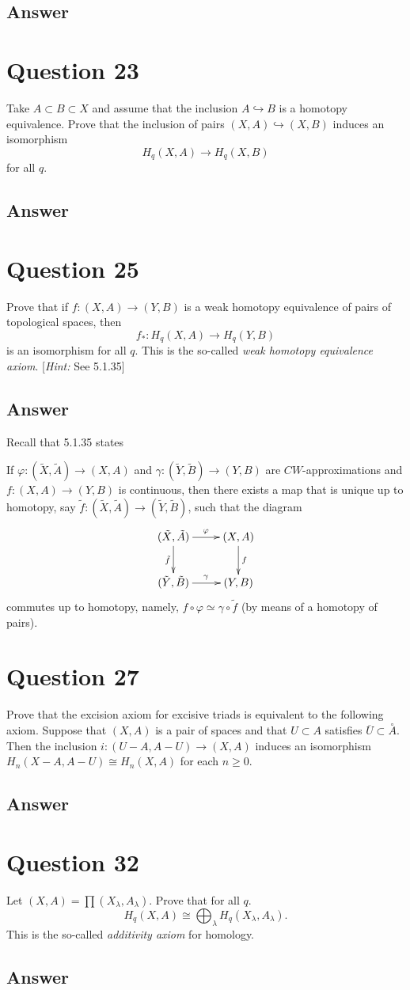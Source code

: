 \documentclass[11pt]{article}
\begin{document}
\subsection{Answer}

\section{Question 23}
Take $A \subset B \subset X$ and assume that the inclusion $A \hookrightarrow B$ is a homotopy equivalence. Prove that the inclusion of pairs $(X,A) \hookrightarrow (X,B)$ induces an isomorphism
\[H_q(X,A) \to H_q(X,B)\]
for all $q$.
\subsection{Answer}


\section{Question 25}
Prove that if $f : (X,A) \to (Y,B)$ is a weak homotopy equivalence of pairs of topological spaces, then 
\[f_*: H_q(X,A) \to H_q(Y,B)\]
is an isomorphism for all $q$. This is the so-called \emph{weak homotopy equivalence axiom}. [\emph{Hint:} See 5.1.35]
\subsection{Answer}
Recall that 5.1.35 states

If $\varphi: ( \tilde{X}, \tilde{A}) \to (X,A)$ and $\gamma: ( \tilde{Y}, \tilde{B}) \to (Y,B) $ are $CW$-approximations and $f: (X,A) \to (Y,B)$ is continuous, then there exists a map that is unique up to homotopy, say $\tilde{f}: (\tilde{X}, \tilde{A}) \to (\tilde{Y}, \tilde{B})$, such that the diagram
\[
\xymatrix{
(\tilde{X}, \tilde{A}) \ar@{->}[r]^\varphi \ar@{->}[d]_{\tilde{f}}& (X,A) \ar@{->}[d]^f\\
(\tilde{Y},\tilde{B}) \ar@{->}[r]^\gamma & (Y,B) \\
}
\]
commutes up to homotopy, namely, $f \circ \varphi \simeq \gamma \circ \tilde{f}$ (by means of a homotopy of pairs).


\section{Question 27}
Prove that the excision axiom for excisive triads is equivalent to the following axiom. Suppose that $(X,A)$ is a pair of spaces and that $U \subset A$ satisfies $\overline{U} \subset \stackrel{\circ}{A}$. Then the inclusion $i: (U -A, A-U) \to (X,A)$ induces an isomorphism $H_n (X - A, A-U) \cong H_n(X,A)$ for each $n \geq 0$.
\subsection{Answer}


\section{Question 32}
Let $(X,A) = \prod (X_\lambda , A_\lambda)$. Prove that for all $q$.
\[H_q(X,A) \cong \bigoplus_\lambda H_q(X_\lambda, A_\lambda). \]
This is the so-called \emph{additivity axiom} for homology.
\subsection{Answer}
\end{document}

